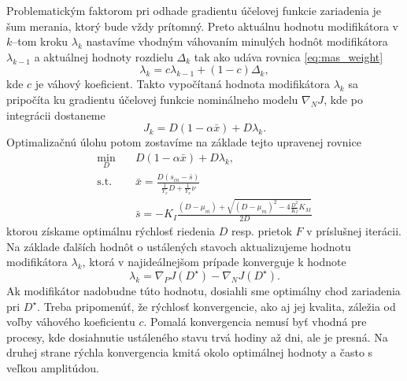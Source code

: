 Problematickým faktorom pri odhade gradientu účelovej funkcie zariadenia je šum merania, ktorý bude vždy prítomný. Preto aktuálnu hodnotu modifikátora v $ k $--tom kroku $ \lambda_k $ nastavíme vhodným váhovaním minulých hodnôt modifikátora $ \lambda_{k-1} $ a aktuálnej hodnoty rozdielu $ \Delta_{k} $ tak ako udáva rovnica \eqref{eq:mas_weight}
\begin{equation*}
	\lambda_k = c\lambda_{k-1} + \left(1 - c\right)\Delta_{k},
\end{equation*}
kde $ c $ je váhový koeficient. Takto vypočítaná hodnota modifikátora $ \lambda_k $ sa pripočíta ku gradientu účelovej funkcie nominálneho modelu $ \nabla_{N}J $, kde po integrácii dostaneme
\begin{equation}
	J_{k} = D\left(1-\alpha\bar{x}\right) + D\lambda_k.
\end{equation}
Optimalizačnú úlohu potom zostavíme na základe tejto upravenej rovnice
\begin{equation}
	\begin{split}
		\min_{D} &\quad D\left(1-\alpha\bar{x}\right) + D\lambda_k, \\
		\text{s.t.} &\quad \bar{x} = \frac{D\left(s_{in}-\bar{s}\right)}{\frac{1}{Y_{x}}D + \frac{1}{Y_{x}}\nu} \\
		&\quad \bar{s} = -K_{I}\frac{\left(D-\mu_{m}\right) + \sqrt{\left(D-\mu_{m}\right)^2 - 4\frac{D^2}{K_{I}}K_{M}}}{2D}
	\end{split}
\end{equation}
ktorou získame optimálnu rýchlosť riedenia $ D $ resp. prietok $ F $ v príslušnej iterácii. Na základe ďalších hodnôt o ustálených stavoch aktualizujeme hodnotu modifikátora $ \lambda_k $, ktorá v najideálnejšom prípade konverguje k hodnote
\begin{equation}
	\label{eq:mas_opt_lambda}
	\lambda_k = \nabla_{P}J\left(D^{\star}\right) - \nabla_{N}J\left(D^{\star}\right).
\end{equation} 
Ak modifikátor nadobudne túto hodnotu, dosiahli sme optimálny chod zariadenia pri $ D^{\star} $. Treba pripomenúť, že rýchlosť konvergencie, ako aj jej kvalita, záležia od voľby váhového koeficientu $ c $. Pomalá konvergencia nemusí byť vhodná pre procesy, kde dosiahnutie ustáleného stavu trvá hodiny až dni, ale je presná. Na druhej strane rýchla konvergencia kmitá okolo optimálnej hodnoty a často s veľkou amplitúdou.
